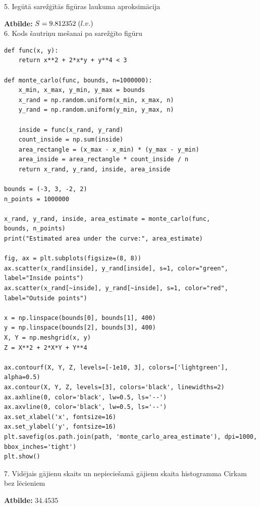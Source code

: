 \documentclass[12pt]{article}
\begin{document}
5. Iegūtā sarežģītās figūras laukuma aproksimācija

\textbf{Atbilde:} $S = 9.812352 \hspace{0.1cm}(l.v.)$ \\

6. Kods šautriņu mešanai pa sarežģīto figūru

\begin{lstlisting}
def func(x, y):
    return x**2 + 2*x*y + y**4 < 3

def monte_carlo(func, bounds, n=1000000):
    x_min, x_max, y_min, y_max = bounds
    x_rand = np.random.uniform(x_min, x_max, n)
    y_rand = np.random.uniform(y_min, y_max, n)
    
    inside = func(x_rand, y_rand)
    count_inside = np.sum(inside)
    area_rectangle = (x_max - x_min) * (y_max - y_min)
    area_inside = area_rectangle * count_inside / n
    return x_rand, y_rand, inside, area_inside

bounds = (-3, 3, -2, 2)
n_points = 1000000

x_rand, y_rand, inside, area_estimate = monte_carlo(func,
bounds, n_points)
print("Estimated area under the curve:", area_estimate)

fig, ax = plt.subplots(figsize=(8, 8))
ax.scatter(x_rand[inside], y_rand[inside], s=1, color="green",
label="Inside points")
ax.scatter(x_rand[~inside], y_rand[~inside], s=1, color="red",
label="Outside points")

x = np.linspace(bounds[0], bounds[1], 400)
y = np.linspace(bounds[2], bounds[3], 400)
X, Y = np.meshgrid(x, y)
Z = X**2 + 2*X*Y + Y**4

ax.contourf(X, Y, Z, levels=[-1e10, 3], colors=['lightgreen'], alpha=0.5)
ax.contour(X, Y, Z, levels=[3], colors='black', linewidths=2)
ax.axhline(0, color='black', lw=0.5, ls='--')
ax.axvline(0, color='black', lw=0.5, ls='--')
ax.set_xlabel('x', fontsize=16)
ax.set_ylabel('y', fontsize=16)
plt.savefig(os.path.join(path, 'monte_carlo_area_estimate'), dpi=1000, 
bbox_inches='tight')
plt.show()
\end{lstlisting}

7. Vidējais gājienu skaits un nepieciešamā gājienu skaita histogramma Cirkam bez lēcieniem

\textbf{Atbilde:} 34.4535
\end{document}
